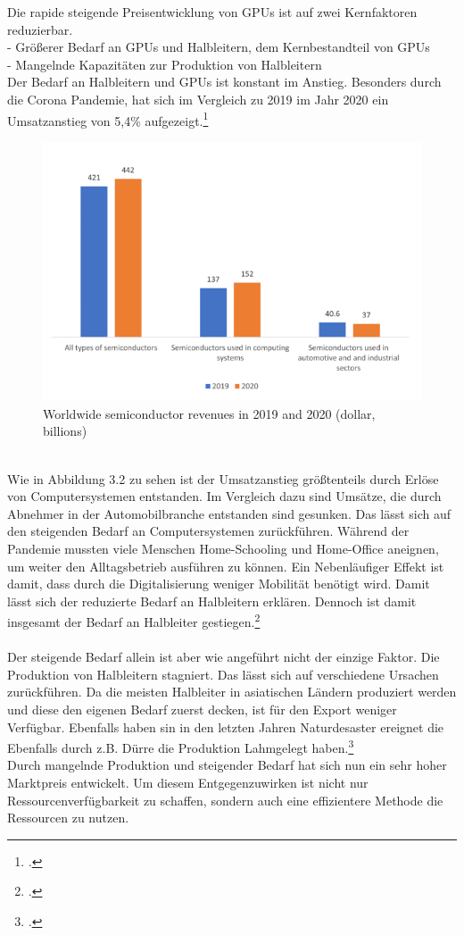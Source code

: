 \documentclass[12pt,toc=bib,toc=listof]{scrreprt}
\begin{document}
Die rapide steigende Preisentwicklung von GPUs ist auf zwei Kernfaktoren reduzierbar.\\
- Größerer Bedarf an GPUs und Halbleitern, dem Kernbestandteil von GPUs\\ %
- Mangelnde Kapazitäten zur Produktion von Halbleitern\\
Der Bedarf an Halbleitern und GPUs ist konstant im Anstieg. Besonders durch die Corona Pandemie,
hat sich im Vergleich zu 2019 im Jahr 2020 ein Umsatzanstieg von 5,4\% aufgezeigt.\footcite [Vgl.] []{Voas.2021}
\begin{figure}[h]
  \centering
  \includegraphics[scale=0.9]{Abbildungen/voas1.png} %
  \caption[]{Worldwide semiconductor revenues in 2019 and 2020 (dollar, billions)}
\end{figure}
\\Wie in Abbildung 3.2 zu sehen ist der Umsatzanstieg größtenteils durch Erlöse von Computersystemen entstanden.
Im Vergleich dazu sind Umsätze, die durch Abnehmer in der Automobilbranche entstanden sind gesunken.
Das lässt sich auf den steigenden Bedarf an Computersystemen zurückführen. Während der Pandemie mussten
viele Menschen Home-Schooling und Home-Office aneignen, um weiter den Alltagsbetrieb ausführen zu können.
Ein Nebenläufiger Effekt ist damit, dass durch die Digitalisierung weniger Mobilität benötigt wird.
Damit lässt sich der reduzierte Bedarf an Halbleitern erklären. Dennoch ist damit insgesamt der Bedarf an 
Halbleiter gestiegen.\footcite [Vgl.] []{Voas.2021}
\\\\ Der steigende Bedarf allein ist aber wie angeführt nicht der einzige Faktor. Die Produktion 
von Halbleitern stagniert. Das lässt sich auf verschiedene Ursachen zurückführen. Da die meisten 
Halbleiter in asiatischen Ländern produziert werden und diese den eigenen Bedarf zuerst decken, ist 
für den Export weniger Verfügbar. Ebenfalls haben sin in den letzten Jahren Naturdesaster ereignet die
Ebenfalls durch z.B. Dürre die Produktion Lahmgelegt haben.\footcite [Vgl.] []{Voas.2021}
\\
Durch mangelnde Produktion und steigender Bedarf hat sich nun ein sehr hoher Marktpreis entwickelt. 
Um diesem Entgegenzuwirken ist nicht nur Ressourcenverfügbarkeit zu schaffen, sondern auch eine effizientere Methode
die Ressourcen zu nutzen.
\end{document}
